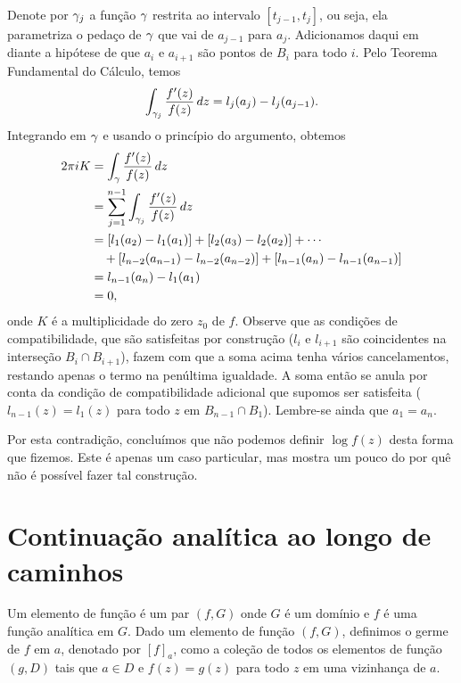     Denote por $\gamma_j$ a função $\gamma$ restrita ao intervalo $[t_{j-1},t_j]$, ou seja, ela
    parametriza o pedaço de $\gamma$ que vai de $a_{j-1}$ para $a_j$. Adicionamos daqui em diante 
    a hipótese de que $a_i$ e $a_{i+1}$ são pontos de $B_i$ para todo $i$. Pelo Teorema Fundamental
    do Cálculo, temos
    \begin{equation*}
        \int_{\gamma_j} \frac{f'(z)}{f(z)}\, dz = 
        l_j(a_j) - l_j(a_{j-1}).  
    \end{equation*}
    Integrando em $\gamma$ e usando o princípio do argumento, obtemos
    \begin{align*}
        2 \pi i K &= \int_\gamma \frac{f'(z)}{f(z)}\, dz \\
                  &= \sum_{j=1}^{n-1}\int_{\gamma_j} \frac{f'(z)}{f(z)}\, dz \\
                  &= [l_1(a_2) - l_1(a_1)] + [l_2(a_3) - l_2(a_2)] + \cdots \\
                  &\quad+ [l_{n-2}(a_{n-1}) - l_{n-2}(a_{n-2})] + 
                          [l_{n-1}(a_{n}) - l_{n-1}(a_{n-1})] \\
                  &= l_{n-1}(a_n) - l_1(a_1)\\
                  &= 0,
    \end{align*}
    onde $K$ é a multiplicidade do zero $z_0$ de $f$. Observe que as condições de compatibilidade,
    que são satisfeitas por construção ($l_i$ e $l_{i+1}$ são coincidentes na interseção 
    $B_i \cap B_{i+1}$), fazem com que a soma acima tenha vários cancelamentos, restando apenas o
    termo na penúltima igualdade. A soma então se anula por conta da condição de compatibilidade
    adicional que supomos ser satisfeita ($l_{n-1}(z) = l_1(z)$ para todo $z$ em 
    $B_{n-1} \cap B_1$). Lembre-se ainda que $a_1 = a_n$.
    
    Por esta contradição, concluímos que não podemos definir $\log f(z)$ desta forma que fizemos.
    Este é apenas um caso particular, mas mostra um pouco do por quê não é possível fazer tal
    construção.

\section{Continuação analítica ao longo de caminhos}


    \begin{definicao}
        \label{def-elemento-funcao}
        Um elemento de função é um par $(f, G)$ onde $G$ é um domínio e $f$
        é uma função analítica em $G$. Dado um elemento de função $(f,G)$, 
        definimos o germe de $f$ em $a$, denotado por $[f]_a$, 
        como a coleção de todos os elementos de função $(g,D)$ tais que 
        $a\in D$ e $f(z) = g(z)$ para todo $z$ em uma vizinhança de $a$.
    \end{definicao}


